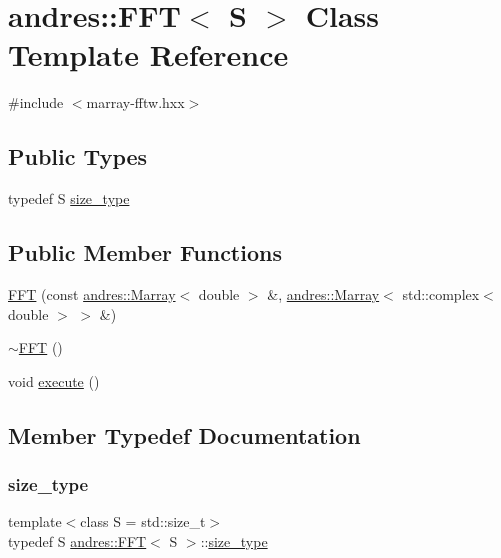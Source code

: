\hypertarget{classandres_1_1FFT}{}\section{andres\+:\+:F\+FT$<$ S $>$ Class Template Reference}
\label{classandres_1_1FFT}


{\ttfamily \#include $<$marray-\/fftw.\+hxx$>$}

\subsection*{Public Types}
\begin{DoxyCompactItemize}
\item 
typedef S \hyperlink{classandres_1_1FFT_a22b9513914905e90538e45d02c5e3601}{size\+\_\+type}
\end{DoxyCompactItemize}
\subsection*{Public Member Functions}
\begin{DoxyCompactItemize}
\item 
\hyperlink{classandres_1_1FFT_a0163fa67e3b12c454ebfd688e54f7859}{F\+FT} (const \hyperlink{classandres_1_1Marray}{andres\+::\+Marray}$<$ double $>$ \&, \hyperlink{classandres_1_1Marray}{andres\+::\+Marray}$<$ std\+::complex$<$ double $>$ $>$ \&)
\item 
\hyperlink{classandres_1_1FFT_a11656c721a5b073be01fbdd71793ee1e}{$\sim$\+F\+FT} ()
\item 
void \hyperlink{classandres_1_1FFT_aa73174ae3df430476d768eab0ad0e283}{execute} ()
\end{DoxyCompactItemize}


\subsection{Member Typedef Documentation}
\mbox{\label{classandres_1_1FFT_a22b9513914905e90538e45d02c5e3601}} 
\subsubsection{\texorpdfstring{size\+\_\+type}{size\_type}}
{\footnotesize\ttfamily template$<$class S  = std\+::size\+\_\+t$>$ \\
typedef S \hyperlink{classandres_1_1FFT}{andres\+::\+F\+FT}$<$ S $>$\+::\hyperlink{classandres_1_1FFT_a22b9513914905e90538e45d02c5e3601}{size\+\_\+type}}



